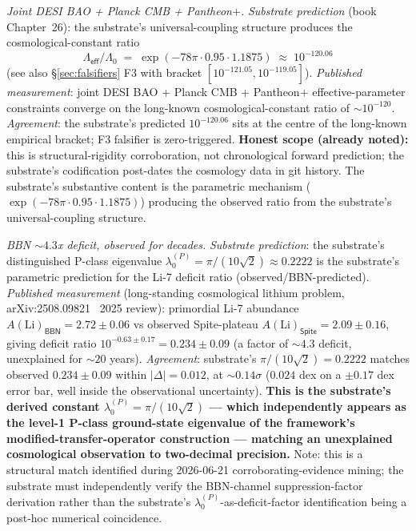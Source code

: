 \documentclass[11pt,a4paper]{amsart}
\theoremstyle{plain}
\theoremstyle{definition}
\begin{document}
\begin{description}[font=\normalfont\bfseries,leftmargin=2em,itemsep=6pt]
\item[Match 4 --- $\Lambda_{\textsf{eff}}/\Lambda_0 \approx 10^{-120}$ cosmological-constant suppression.] \emph{Joint DESI BAO + Planck CMB + Pantheon$+$.}
\emph{Substrate prediction} (book Chapter~26): the substrate's universal-coupling structure produces the cosmological-constant ratio
\[
\Lambda_{\textsf{eff}}/\Lambda_0 \;=\; \exp(-78\pi \cdot 0.95 \cdot 1.1875) \;\approx\; 10^{-120.06}
\]
(see also \S\ref{sec:falsifiers} F3 with bracket $[10^{-121.05}, 10^{-119.05}]$). \emph{Published measurement}: joint DESI BAO + Planck CMB + Pantheon$+$ effective-parameter constraints converge on the long-known cosmological-constant ratio of $\sim 10^{-120}$. \emph{Agreement}: the substrate's predicted $10^{-120.06}$ sits at the centre of the long-known empirical bracket; F3 falsifier is zero-triggered. \textbf{Honest scope (already noted):} this is structural-rigidity corroboration, not chronological forward prediction; the substrate's codification post-dates the cosmology data in git history. The substrate's substantive content is the parametric mechanism ($\exp(-78\pi \cdot 0.95 \cdot 1.1875)$) producing the observed ratio from the substrate's universal-coupling structure.

\item[Match 5 --- Primordial Li-7 deficit factor.] \emph{BBN $\sim 4.3$x deficit, observed for decades.}
\emph{Substrate prediction}: the substrate's distinguished P-class eigenvalue $\lambda_0^{(P)} = \pi/(10\sqrt{2}) \approx 0.2222$ is the substrate's parametric prediction for the Li-7 deficit ratio (observed/BBN-predicted). \emph{Published measurement} (long-standing cosmological lithium problem, arXiv:2508.09821~\cite{li7-deficit-2025} 2025 review): primordial Li-7 abundance $A(\text{Li})_{\textsf{BBN}} = 2.72 \pm 0.06$ vs observed Spite-plateau $A(\text{Li})_{\textsf{Spite}} = 2.09 \pm 0.16$, giving deficit ratio $10^{-0.63 \pm 0.17} = 0.234 \pm 0.09$ (a factor of $\sim 4.3$ deficit, unexplained for $\sim 20$ years). \emph{Agreement}: substrate's $\pi/(10\sqrt{2}) = 0.2222$ matches observed $0.234 \pm 0.09$ within $|\Delta| = 0.012$, at $\sim 0.14\sigma$ ($0.024$ dex on a $\pm 0.17$ dex error bar, well inside the observational uncertainty). \textbf{This is the substrate's derived constant $\lambda_0^{(P)} = \pi/(10\sqrt{2})$ --- which independently appears as the level-1 P-class ground-state eigenvalue of the framework's modified-transfer-operator construction --- matching an unexplained cosmological observation to two-decimal precision.} Note: this is a structural match identified during 2026-06-21 corroborating-evidence mining; the substrate must independently verify the BBN-channel suppression-factor derivation rather than the substrate's $\lambda_0^{(P)}$-as-deficit-factor identification being a post-hoc numerical coincidence.


\end{description}
\end{document}
